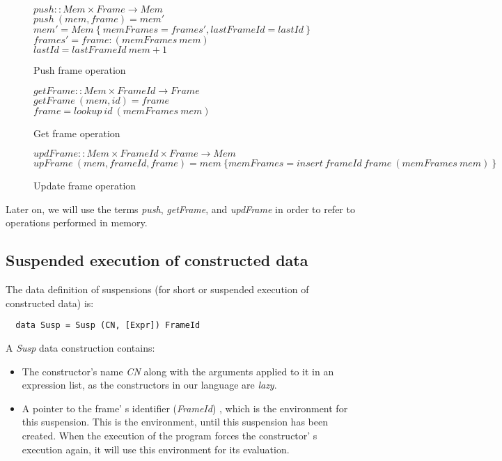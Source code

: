 \documentclass[diploma]{softlab-thesis}
\begin{document}
\begin{figure}[h]
  $ \mathit{push} :: \mathit{Mem \times Frame \rightarrow Mem} $ \\
  $ \mathit{push~(mem, frame) = mem'} $ \\
  $ \mathit{mem' = Mem~\{~memFrames = frames', lastFrameId = lastId~\} } $ \\
  $ \mathit{frames' = frame : (memFrames~mem)} $ \\
  $ \mathit{lastId = lastFrameId~mem + 1} $
\caption{Push frame operation\label{fig:push}}
\end{figure}

\begin{figure}[h]
  $ \mathit{getFrame} :: \mathit{Mem \times FrameId \rightarrow Frame} $ \\
  $ \mathit{getFrame~(mem, id) = frame} $ \\
  $ \mathit{frame = lookup~id~(memFrames~mem)} $
\caption{Get frame operation\label{fig:getFrame}}
\end{figure}

\begin{figure}[h]
  $ \mathit{updFrame} :: \mathit{Mem \times FrameId \times Frame \rightarrow Mem} $ \\
  $ \mathit{upFrame~(mem, frameId, frame) = 
      mem~\{memFrames = insert~frameId~frame~(memFrames~mem)~\} } $ 
\caption{Update frame operation\label{fig:updFrame}}
\end{figure}


Later on, we will use the terms \textit{push}, \textit{getFrame}, and \textit{updFrame} in order to refer to 
operations performed in memory.

\subsection{Suspended execution of constructed data}
\label{sec:suspended}

The data definition of suspensions (for short or suspended execution of constructed data) is:
\begin{verbatim}
  data Susp = Susp (CN, [Expr]) FrameId
\end{verbatim}

A \textit{Susp} data construction contains:
\begin{itemize}
  \item The constructor's name \textit{CN} along with the arguments applied to it in an expression list, 
  as the constructors in our language are \textit{lazy}.
  \item A pointer to the frame' s identifier (\textit{FrameId}) , which is the environment for this suspension.
  This is the environment, until this suspension has been created. When the execution of the program forces the 
  constructor' s execution again, it will use this environment for its evaluation.
\end{itemize}
\end{document}
